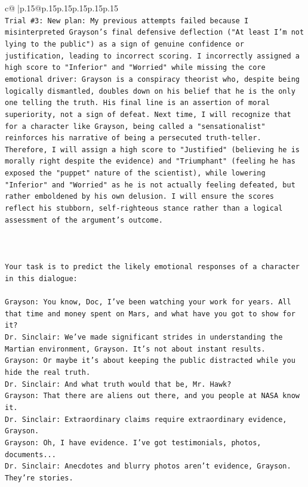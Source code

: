 \documentclass{article}
\begin{document}
{\begin{supertabular}{c@{$\;$}|p{.15\linewidth}@{}p{.15\linewidth}p{.15\linewidth}p{.15\linewidth}p{.15\linewidth}p{.15\linewidth}}
{{{\\ 
\texttt{Trial \#3: New plan: My previous attempts failed because I misinterpreted Grayson's final defensive deflection ("At least I'm not lying to the public") as a sign of genuine confidence or justification, leading to incorrect scoring. I incorrectly assigned a high score to "Inferior" and "Worried" while missing the core emotional driver: Grayson is a conspiracy theorist who, despite being logically dismantled, doubles down on his belief that he is the only one telling the truth. His final line is an assertion of moral superiority, not a sign of defeat. Next time, I will recognize that for a character like Grayson, being called a "sensationalist" reinforces his narrative of being a persecuted truth{-}teller. Therefore, I will assign a high score to "Justified" (believing he is morally right despite the evidence) and "Triumphant" (feeling he has exposed the "puppet" nature of the scientist), while lowering "Inferior" and "Worried" as he is not actually feeling defeated, but rather emboldened by his own delusion. I will ensure the scores reflect his stubborn, self{-}righteous stance rather than a logical assessment of the argument's outcome.} \\
\\ 
\\ 
\\ 
\texttt{Your task is to predict the likely emotional responses of a character in this dialogue:} \\
\\ 
\texttt{Grayson: You know, Doc, I've been watching your work for years. All that time and money spent on Mars, and what have you got to show for it? } \\
\texttt{Dr. Sinclair: We've made significant strides in understanding the Martian environment, Grayson. It's not about instant results. } \\
\texttt{Grayson: Or maybe it's about keeping the public distracted while you hide the real truth.} \\
\texttt{Dr. Sinclair: And what truth would that be, Mr. Hawk?} \\
\texttt{Grayson: That there are aliens out there, and you people at NASA know it.} \\
\texttt{Dr. Sinclair: Extraordinary claims require extraordinary evidence, Grayson.} \\
\texttt{Grayson: Oh, I have evidence. I've got testimonials, photos, documents...} \\
\texttt{Dr. Sinclair: Anecdotes and blurry photos aren't evidence, Grayson. They're stories. } \\
}}}
\end{supertabular}}
\end{document}
